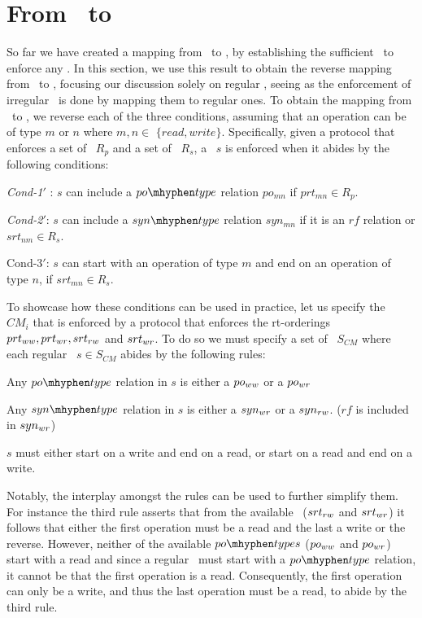 \section{From \rts\ to \mcms} \label{sec:rt-to-cons}
So far we have created a mapping from \mcms\ to \rts, by establishing the sufficient \rts\ to enforce any \synpat.
In this section, we use this result to obtain the reverse mapping from \rts\ to \mcms,  focusing our discussion solely on regular \synpats, seeing as the enforcement of irregular \synpats\ is done by mapping them to regular ones.
To obtain the mapping from \rts\ to \synpats, we reverse each of the three conditions, assuming that an operation can be of type $m$ or $n$ where $m, n \in$ $\{read, write\}$. Specifically, given a protocol that enforces a set of \prts\ $R_p$ and a set of \srts\ $R_s$, a \synpat\ $s$ is enforced when it abides by the following conditions:


\squishlist
\item \emph{Cond-1$'$} : $s$ can include a $\potype$ relation $po_{mn}$ if $prt_{mn} \in R_p$.
\item \emph{Cond-2$'$}: $s$ can include a $\syntype$ relation $syn_{mn}$ if it is an $rf$ relation or $srt_{nm} \in R_s$. 
\item {Cond-3$'$}: $s$ can start with an operation of type $m$ and end on an operation of type $n$, if $srt_{mn} \in R_s$.
\squishend

To showcase how these conditions can be used in practice, let us specify the \mcm\ $CM_{i}$ that is enforced by a protocol that enforces the rt-orderings $prt_{ww}, prt_{wr}, srt_{rw}$ and $srt_{wr}$.  %
To do so we must specify a set of \synpats\ $S_{CM}$  where each regular \synpat\ $s \in S_{CM}$ abides by the following rules:
\squishlist
\item Any $\potype$ relation in $s$ is either a $po_{ww}$ or a $po_{wr}$
\item Any $\syntype$ relation in $s$ is either a $syn_{wr}$ or a $syn_{rw}$. ($rf$ is included in $syn_{wr}$)
\item $s$ must either start on a write and end on a read, or start on a read and end on a write.
\squishend

Notably, the interplay amongst the rules can be used to further simplify them. For instance the third rule asserts that from the available \srts\ ($srt_{rw}$ and $srt_{wr}$) it follows that either the first operation must be a read and the last a write or the reverse. However, neither of the available $\potypes$ ($po_{ww}$ and $po_{wr}$) start with a read and since a regular \synpat\ must start with a $\potype$ relation, it cannot be that the first operation is a read. Consequently, the first operation can only be a write, and thus the last operation must be a read, to abide by the third rule. 


